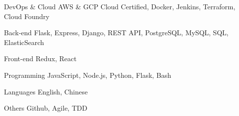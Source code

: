 

\begin{cvskills}

  \cvskill
    {DevOps \& Cloud} %
    {AWS \& GCP Cloud Certified, Docker, Jenkins, Terraform, Cloud Foundry} %

  \cvskill
    {Back-end} %
    {Flask, Express, Django, REST API, PostgreSQL, MySQL, SQL, ElasticSearch} %

  \cvskill
    {Front-end} %
    {Redux, React} %

  \cvskill
    {Programming} %
    {JavaScript, Node.js, Python, Flask, Bash} %

  \cvskill
    {Languages} %
    {English, Chinese} %

  \cvskill
    {Others} %
    {Github, Agile, TDD} %


\end{cvskills}
